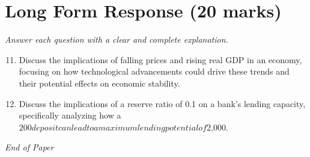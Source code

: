 \documentclass[12pt]{article}
\begin{document}
\section*{Long Form Response (20 marks)}
\textit{Answer each question with a clear and complete explanation.}
\begin{enumerate}[label=\arabic*.]
\setcounter{enumi}{10}
\item Discuss the implications of falling prices and rising real GDP in an economy, focusing on how technological advancements could drive these trends and their potential effects on economic stability.
\item Discuss the implications of a reserve ratio of 0.1 on a bank's lending capacity, specifically analyzing how a $200 deposit can lead to a maximum lending potential of $2,000.
\end{enumerate}

\vfill
\noindent\textit{End of Paper}
\end{document}
